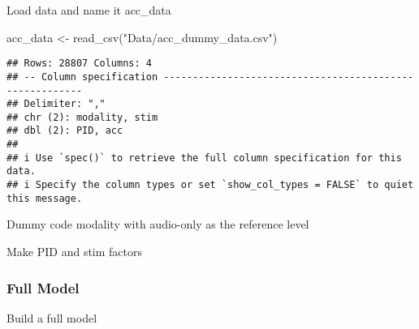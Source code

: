 \documentclass[
]{article}
\newenvironment{Shaded}{\begin{snugshade}}{\end{snugshade}}
\newcommand{\DecValTok}[1]{\textcolor[rgb]{0.00,0.00,0.81}{#1}}
\newcommand{\FunctionTok}[1]{\textcolor[rgb]{0.00,0.00,0.00}{#1}}
\newcommand{\NormalTok}[1]{#1}
\newcommand{\OtherTok}[1]{\textcolor[rgb]{0.56,0.35,0.01}{#1}}
\newcommand{\SpecialCharTok}[1]{\textcolor[rgb]{0.00,0.00,0.00}{#1}}
\newcommand{\StringTok}[1]{\textcolor[rgb]{0.31,0.60,0.02}{#1}}
\begin{document}
Load data and name it acc\_data

\begin{Shaded}
\begin{Highlighting}[]
\NormalTok{acc\_data }\OtherTok{\textless{}{-}} \FunctionTok{read\_csv}\NormalTok{(}\StringTok{"Data/acc\_dummy\_data.csv"}\NormalTok{)}
\end{Highlighting}
\end{Shaded}

\begin{verbatim}
## Rows: 28807 Columns: 4
## -- Column specification --------------------------------------------------------
## Delimiter: ","
## chr (2): modality, stim
## dbl (2): PID, acc
## 
## i Use `spec()` to retrieve the full column specification for this data.
## i Specify the column types or set `show_col_types = FALSE` to quiet this message.
\end{verbatim}

Dummy code modality with audio-only as the reference level

\begin{Shaded}
\end{Shaded}

Make PID and stim factors

\begin{Shaded}
\end{Shaded}

\hypertarget{full-model-1}{%
\subsubsection{Full Model}\label{full-model-1}}

Build a full model
\end{document}
